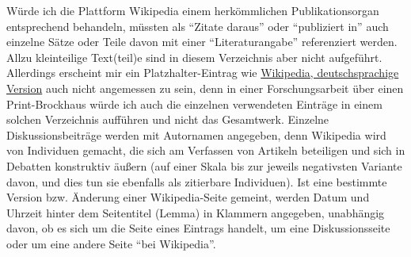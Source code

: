 \documentclass[fontsize=12pt]{scrartcl}
\begin{document}
{{{{W\"urde ich die Plattform Wi\-ki\-pe\-dia einem herk\"ommlichen Pu\-bli\-kationsorgan ent\-spre\-chend behandeln, m\"ussten als "`Zitate daraus"' oder "`pu\-bli\-ziert in"' auch einzelne S\"atze oder Teile davon mit einer "`Li\-te\-ra\-tur\-angabe"' referenziert werden. Allzu kleinteilige Text(teil)e sind in diesem Verzeichnis aber nicht aufgef\"uhrt. Al\-ler\-dings erscheint mir ein Platz\-hal\-ter-Ein\-trag wie \href{https://de.wikipedia.org}{Wi\-ki\-pe\-dia, deutschspra\-chi\-ge Version} auch nicht angemessen zu sein, denn in einer For\-schungs\-arbeit \"uber einen Print-Brockhaus w\"urde ich auch die einzelnen verwendeten Eintr\"age in einem solchen Verzeichnis auff\"uhren und nicht das Gesamtwerk. Einzelne Dis\-kus\-si\-onsbeitr\"age werden mit Au\-tor\textsuperscript{\tiny *}\-na\-men angegeben, denn Wi\-ki\-pe\-dia wird von Individuen ge\-macht, die sich am Verfassen von Artikeln beteiligen und sich in Debatten konstruktiv \"au{\ss}ern (auf ei\-ner Skala bis zur jeweils negativsten Variante davon, und dies tun sie ebenfalls als zitierbare Individuen). Ist eine bestimmte Version bzw. \"Anderung einer Wi\-ki\-pe\-dia-Seite gemeint, werden Datum und Uhrzeit hinter dem Sei\-tentitel (Lemma) in Klammern angegeben, unabh\"angig davon, ob es sich um die Seite eines Eintrags handelt, um eine Dis\-kus\-si\-onsseite oder um eine andere Seite "`bei Wi\-ki\-pe\-dia"'.

}}}}
\end{document}
